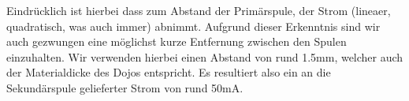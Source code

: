 Eindrücklich ist hierbei dass zum Abstand der Primärspule, der Strom (lineaer, quadratisch, was auch immer) abnimmt. Aufgrund dieser Erkenntnis sind wir auch gezwungen eine möglichst kurze Entfernung zwischen den Spulen einzuhalten. Wir verwenden hierbei einen Abstand von rund 1.5mm, welcher auch der Materialdicke des Dojos entspricht. Es resultiert also ein an die Sekundärspule gelieferter Strom von rund 50mA.
